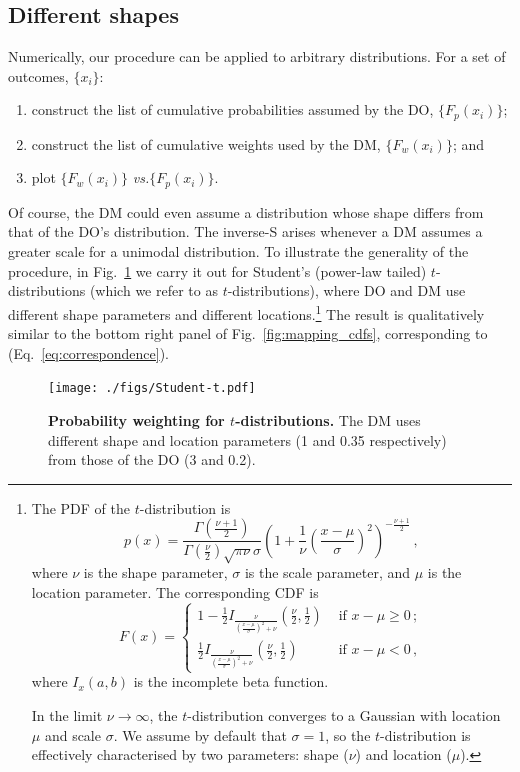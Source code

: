 \documentclass[a4paper, 12pt]{article}
\newcommand{\eref}[1]{(Eq.~\ref{eq:#1})}
\newcommand{\flabel}[1]{\label{fig:#1}}
\newcommand{\fref}[1]{Fig.~\ref{fig:#1}}
\newcommand{\seclabel}[1]{\label{sec:#1}}
\newcommand{\vs}{\textit{vs.}\xspace}
\newcommand{\be}{\begin{equation}}
\newcommand{\ee}{\end{equation}}
\begin{document}
\FloatBarrier

\subsection{Different shapes\seclabel{Different_shapes}}
Numerically, our procedure can be applied to arbitrary distributions. For a set of outcomes, $\{x_i\}$:
\begin{enumerate}
\item
construct the list of cumulative probabilities assumed by the DO, $\{F_p(x_i)\}$;
\item
construct the list of cumulative weights used by the DM, $\{F_w(x_i)\}$; and
\item
plot $\{F_w(x_i)\}$ \vs $\{F_p(x_i)\}$.
\end{enumerate}
Of course, the DM could even assume a distribution whose shape differs from that of the DO's distribution.
The inverse-S arises whenever a DM assumes a greater scale for a unimodal distribution.
To illustrate the generality of the procedure, in \fref{Student-t} we carry it out for Student's (power-law tailed) $t$-distributions (which we refer to as $t$-distributions), where DO and DM use different shape parameters and different locations.\footnote{
The PDF of the $t$-distribution is
%
\be
p\left(x\right) = \frac{\Gamma\left(\frac{\nu+1}{2}\right)} {\Gamma\left(\frac{\nu}{2}\right)\sqrt{\pi\nu}\sigma} \left(1+\frac{1}{\nu}\left(\frac{x-\mu}{\sigma}\right)^2 \right)^{-\frac{\nu+1}{2}}\,,
\ee
%
where $\nu$ is the shape parameter, $\sigma$ is the scale parameter, and $\mu$ is the location parameter. The corresponding CDF is
%
\be
F\left(x\right) =
\begin{cases}
1 - \frac{1}{2} I_{\frac{\nu}{\left(\frac{x-\mu}{\sigma}\right)^2 + \nu}}\left(\frac{\nu}{2},\frac{1}{2}\right) &\text{ if } x-\mu \geq 0\,;\\
\frac{1}{2} I_{\frac{\nu}{\left(\frac{x-\mu}{\sigma}\right)^2 + \nu}}\left(\frac{\nu}{2},\frac{1}{2}\right) &\text{ if } x-\mu < 0\,,
\end{cases}
\ee
%
where $I_x\left(a,b\right)$ is the incomplete beta function.

In the limit $\nu \rightarrow \infty$, the $t$-distribution converges to a Gaussian with location $\mu$ and scale $\sigma$. We assume by default that $\sigma = 1$, so the $t$-distribution is effectively characterised by two parameters: shape ($\nu$) and location ($\mu$).
}
The result is qualitatively similar to the bottom right panel of \fref{mapping_cdfs}, corresponding to \eref{correspondence}.
\begin{figure}[!htb]
\centering
\texttt{[image: ./figs/Student-t.pdf]}
\caption{\textbf{Probability weighting for $t$-distributions.} The DM uses different shape and location parameters (1 and 0.35 respectively) from those of the DO (3 and 0.2).}
\flabel{Student-t}
\end{figure}
\end{document}
